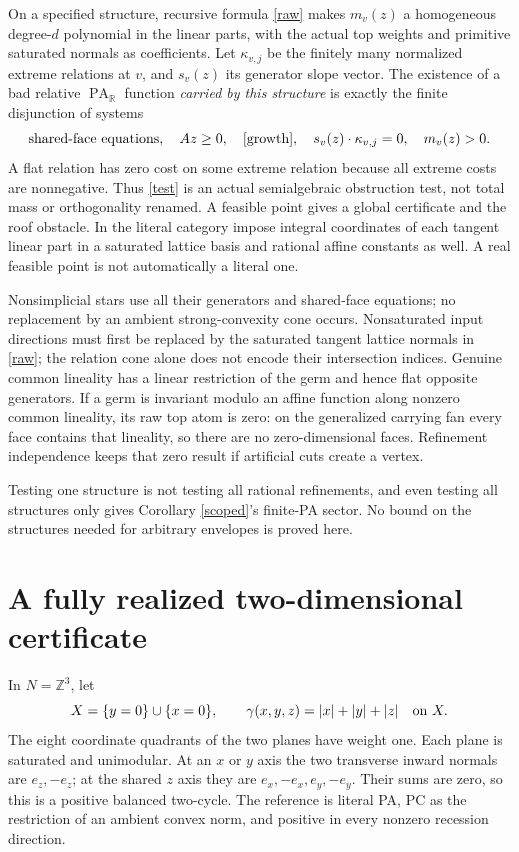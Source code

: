 \documentclass[11pt]{article}
\newcommand{\R}{\mathbb R}
\newcommand{\Z}{\mathbb Z}
\newcommand{\PA}{\operatorname{PA}}
\begin{document}
On a specified structure, recursive formula \eqref{raw} makes
\(m_v(z)\) a homogeneous degree-\(d\) polynomial in the linear parts,
with the actual top weights and primitive saturated normals as
coefficients. Let \(\kappa_{v,j}\) be the finitely many normalized
extreme relations at \(v\), and \(s_v(z)\) its generator slope vector.
The existence of a bad relative \(\PA_\R\) function \emph{carried by
this structure} is exactly the finite disjunction of systems
\begin{equation}\label{test}
 \text{shared-face equations},\quad Az\geq0,\quad
 \eqref{growth},\quad
 s_v(z)\cdot\kappa_{v,j}=0,\quad m_v(z)>0.
\end{equation}
A flat relation has zero cost on some extreme relation because all
extreme costs are nonnegative. Thus \eqref{test} is an actual
semialgebraic obstruction test, not total mass or orthogonality
renamed. A feasible point gives a global certificate and the roof
obstacle. In the literal category impose integral coordinates of
each tangent linear part in a saturated lattice basis and rational
affine constants as well. A real feasible point is not automatically
a literal one.

Nonsimplicial stars use all their generators and shared-face equations;
no replacement by an ambient strong-convexity cone occurs.
Nonsaturated input directions must first be replaced by the saturated
tangent lattice normals in \eqref{raw}; the relation cone alone does
not encode their intersection indices. Genuine common lineality has
a linear restriction of the germ and hence flat opposite generators.
If a germ is invariant modulo an affine function along nonzero common
lineality, its raw top atom is zero: on the generalized carrying fan
every face contains that lineality, so there are no zero-dimensional
faces. Refinement independence keeps that zero result if artificial
cuts create a vertex.

Testing one structure is not testing all rational refinements, and even
testing all structures only gives Corollary \ref{scoped}'s finite-PA
sector. No bound on the structures needed for arbitrary envelopes is
proved here.

\section{A fully realized two-dimensional certificate}
In \(N=\Z^3\), let
\[
 X=\{y=0\}\cup\{x=0\},\qquad
 \gamma(x,y,z)=|x|+|y|+|z|\quad\hbox{on }X.
\]
The eight coordinate quadrants of the two planes have weight one.
Each plane is saturated and unimodular. At an \(x\) or \(y\) axis
the two transverse inward normals are \(e_z,-e_z\); at the shared
\(z\) axis they are \(e_x,-e_x,e_y,-e_y\). Their sums are zero,
so this is a positive balanced two-cycle. The reference is literal
PA, PC as the restriction of an ambient convex norm, and positive
in every nonzero recession direction.
\end{document}
